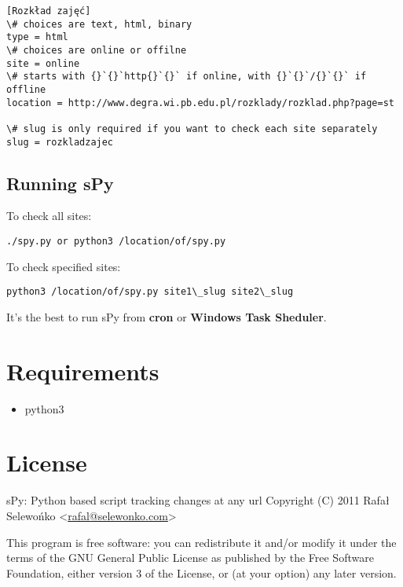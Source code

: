 \documentclass[letterpaper,10pt,english]{sphinxmanual}
\begin{document}
\begin{Verbatim}[commandchars=\\\{\}]
[Rozkład zajęć]
\# choices are text, html, binary
type = html
\# choices are online or offilne
site = online
\# starts with {}`{}`http{}`{}` if online, with {}`{}`/{}`{}` if offline
location = http://www.degra.wi.pb.edu.pl/rozklady/rozklad.php?page=st

\# slug is only required if you want to check each site separately
slug = rozkladzajec
\end{Verbatim}


\section{Running sPy}
\label{index:running-spy}
To check all sites:

\begin{Verbatim}[commandchars=\\\{\}]
./spy.py or python3 /location/of/spy.py
\end{Verbatim}

To check specified sites:

\begin{Verbatim}[commandchars=\\\{\}]
python3 /location/of/spy.py site1\_slug site2\_slug
\end{Verbatim}

It's the best to run sPy from \textbf{cron} or \textbf{Windows Task Sheduler}.


\chapter{Requirements}
\label{index:requirements}\begin{itemize}
\item {} 
python3

\end{itemize}


\chapter{License}
\label{index:license}
sPy: Python based script tracking changes at any url
Copyright (C) 2011  Rafał Selewońko \textless{}\href{mailto:rafal@selewonko.com}{rafal@selewonko.com}\textgreater{}

This program is free software: you can redistribute it and/or modify
it under the terms of the GNU General Public License as published by
the Free Software Foundation, either version 3 of the License, or
(at your option) any later version.
\end{document}
